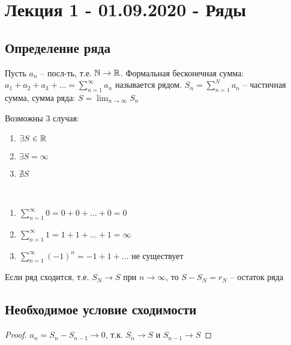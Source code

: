 \section{Лекция 1 - 01.09.2020 - Ряды}
\subsection{Определение ряда}
\begin{definition}
Пусть $a_{n}$ -- посл-ть, т.е. $\mathbb{N} \rightarrow \mathbb{R}$. Формальная бесконечная сумма: $a_1 + a_2 + a_3 + \dots = \sum_{n=1}^{\infty} a_n$ называется рядом.
$S_n = \sum_{n = 1}^{N} a_n$ -- частичная сумма, сумма ряда: $S = \lim_{n \rightarrow \infty} S_n$
\end{definition}

Возможны 3 случая:
\begin{enumerate}
    \item $\exists S \in \mathbb{R}$
    \item $\exists S = \infty$
    \item $\nexists S$
\end{enumerate}

\begin{example}~
    \begin{enumerate}
        \item $\sum_{n = 1}^{\infty} 0 = 0 + 0 + \dots + 0 = 0$
        \item $\sum_{n = 1}^{\infty} 1 = 1 + 1 + \dots + 1 = \infty$
        \item $\sum_{n = 1}^{\infty} (-1)^{n} = -1 + 1 + \dots$ не существует
    \end{enumerate}
\end{example}

\begin{definition}
    Если ряд сходится, т.е. $S_N \rightarrow S$ при $n \rightarrow \infty$, то $S - S_N = r_N$ -- остаток ряда
\end{definition}

\subsection{Необходимое условие сходимости}
\begin{comment}~
    Если ряд сходится, то $a_n \rightarrow 0$
\end{comment}
\begin{proof}
    $a_n = S_n - S_{n - 1} \rightarrow 0$, т.к. $S_n \rightarrow S$ и $S_{n - 1} \rightarrow S$
\end{proof}
